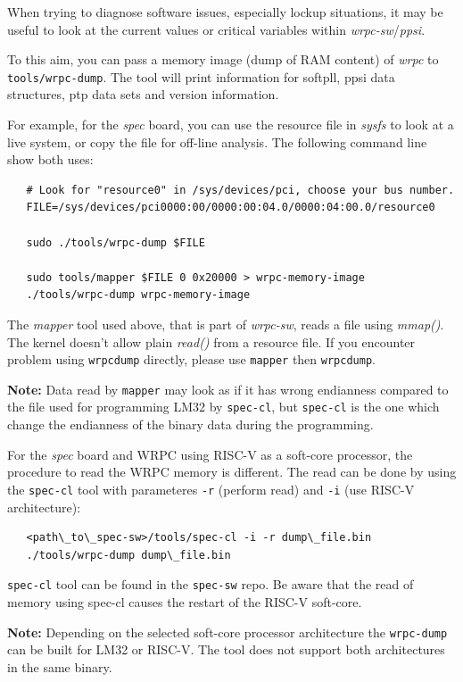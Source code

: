 \documentclass[a4paper, 12pt]{article}
\renewcommand{\_}{\underscore\allowbreak}
\begin{document}
When trying to diagnose software issues, especially lockup situations,
it may be useful to look at the current values or critical variables
within \textit{wrpc-sw}/\textit{ppsi}.

To this aim, you can pass a memory image (dump of RAM content) of \textit{wrpc} to
\texttt{tools/wrpc-dump}.
The tool will print information for softpll, ppsi data structures,
ptp data sets and version information.

For example, for the \textit{spec} board, you can use the resource file in
\textit{sysfs} to look at a live system, or copy the file for off-line
analysis. The following command line show both uses:

\begin{lstlisting}
   # Look for "resource0" in /sys/devices/pci, choose your bus number.
   FILE=/sys/devices/pci0000:00/0000:00:04.0/0000:04:00.0/resource0

   sudo ./tools/wrpc-dump $FILE

   sudo tools/mapper $FILE 0 0x20000 > wrpc-memory-image
   ./tools/wrpc-dump wrpc-memory-image
\end{lstlisting}

The \textit{mapper} tool used above, that is part of \textit{wrpc-sw}, reads a file
using \textit{mmap()}. The kernel doesn't allow plain \textit{read()} from a
resource file. If you encounter problem using \texttt{wrpc\_dump} directly,
please use \texttt{mapper} then \texttt{wrpc\_dump}.

\textbf{Note:} Data read by \texttt{mapper} may look as if it has wrong endianness compared
to the file used for programming LM32 by \texttt{spec-cl}, but \texttt{spec-cl} is the
one which change the endianness of the binary data during the programming.

For the \textit{spec} board and WRPC using RISC-V as a soft-core processor,
the procedure to read the WRPC memory is different. The read can be done by
using the \texttt{spec-cl} tool with parameteres \texttt{-r} (perform read)
and \texttt{-i} (use RISC-V architecture):
\begin{lstlisting}
   <path\_to\_spec-sw>/tools/spec-cl -i -r dump\_file.bin
   ./tools/wrpc-dump dump\_file.bin
\end{lstlisting}

\texttt{spec-cl} tool can be found in the \texttt{spec-sw} repo. Be aware
that the read of memory using spec-cl causes the restart of the RISC-V
soft-core.

\textbf{Note:} Depending on the selected soft-core processor architecture
the \texttt{wrpc-dump} can be built for LM32 or RISC-V. The tool does not
support both architectures in the same binary.
\end{document}
